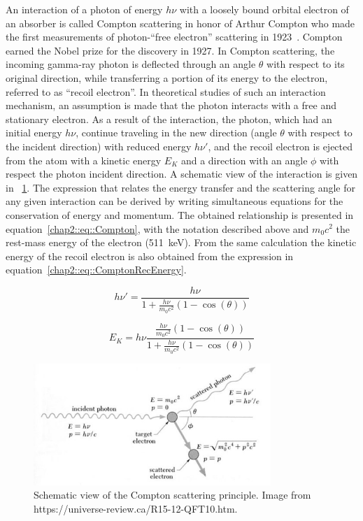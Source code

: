 An interaction of a photon of energy $h\nu$  with a loosely bound orbital electron of an absorber is called Compton scattering in honor of Arthur Compton who made the first measurements of photon-\enquote{free electron} scattering in 1923~\parencite{Compton1923}. Compton earned the Nobel prize for the discovery in 1927.  
In Compton scattering, the incoming gamma-ray photon is deflected through an angle $\theta$ with respect to its original direction, while transferring a portion of its energy to the electron, referred to as \enquote{recoil electron}. In theoretical studies of such an interaction mechanism, an assumption is made that the photon interacts with a free and stationary electron. As a result of the interaction, the photon, which had an initial energy $h\nu$, continue traveling in the new direction (angle $\theta$ with respect to the incident direction) with reduced energy $h\nu'$, and the recoil electron is ejected from the atom with a kinetic energy $E_K$ and a direction with an angle $\phi$ with respect the photon incident direction. A schematic view of the interaction is given in \figurename~\ref{chap2::fig::compton_principle}.
The expression that relates the energy transfer and the scattering angle for any given interaction can be derived by writing simultaneous equations for the conservation of energy and momentum. The obtained relationship is presented in equation~\ref{chap2::eq::Compton}, with the notation described above and $m_{0}c^2$ the rest-mass energy of the electron (511~keV). From the same calculation the kinetic energy of the recoil electron is also obtained from the expression in equation~\ref{chap2::eq::ComptonRecEnergy}.

\begin{equation}
h\nu' = \frac{h\nu}{1+\frac{h\nu}{m_{0}c^2}(1-\cos(\theta))}
\label{chap2::eq::Compton}
\end{equation} 

\begin{equation}
E_K = h\nu \frac{\frac{h\nu}{m_0c^2} (1-\cos(\theta))}{1+\frac{h\nu}{m_{0}c^2}(1-\cos(\theta))}
\label{chap2::eq::ComptonRecEnergy}
\end{equation} 

\begin{figure}[!htbp]
\centering
\includegraphics[width=0.8\textwidth]{03_GraphicFiles/chapter2_GammaCameras/ComptonPrinciple.jpg}
\caption{Schematic view of the Compton scattering principle. Image from https://universe-review.ca/R15-12-QFT10.htm.}
\label{chap2::fig::compton_principle}
\end{figure} 

